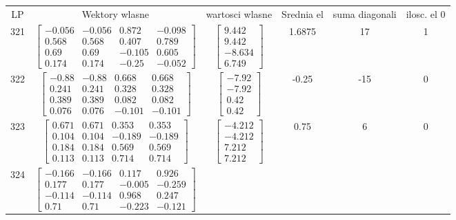 \documentclass[a4paper,12pt]{article}
\begin{document}
\bgroup {} \vspace{0.2in} \begin{tabular}{c c c c c c}
LP &Wektory wlasne & wartosci wlasne & Srednia el & suma diagonali & ilosc. el 0\\
321
&
$\begin{bmatrix} -0.056 & -0.056 & 0.872 & -0.098 \\ 0.568 & 0.568 & 0.407 & 0.789 \\ 0.69 & 0.69 & -0.105 & 0.605 \\ 0.174 & 0.174 & -0.25 & -0.052 \end{bmatrix}$
&
$\begin{bmatrix} 9.442 \\ 9.442 \\ -8.634 \\ 6.749 \end{bmatrix}$
&
1.6875
&
17
&
1
\\
322
&
$\begin{bmatrix} -0.88 & -0.88 & 0.668 & 0.668 \\ 0.241 & 0.241 & 0.328 & 0.328 \\ 0.389 & 0.389 & 0.082 & 0.082 \\ 0.076 & 0.076 & -0.101 & -0.101 \end{bmatrix}$
&
$\begin{bmatrix} -7.92 \\ -7.92 \\ 0.42 \\ 0.42 \end{bmatrix}$
&
-0.25
&
-15
&
0
\\
323
&
$\begin{bmatrix} 0.671 & 0.671 & 0.353 & 0.353 \\ 0.104 & 0.104 & -0.189 & -0.189 \\ 0.184 & 0.184 & 0.569 & 0.569 \\ 0.113 & 0.113 & 0.714 & 0.714 \end{bmatrix}$
&
$\begin{bmatrix} -4.212 \\ -4.212 \\ 7.212 \\ 7.212 \end{bmatrix}$
&
0.75
&
6
&
0
\\
324
&
$\begin{bmatrix} -0.166 & -0.166 & 0.117 & 0.926 \\ 0.177 & 0.177 & -0.005 & -0.259 \\ -0.114 & -0.114 & 0.968 & 0.247 \\ 0.71 & 0.71 & -0.223 & -0.121 \end{bmatrix}$

\end{tabular}
\end{document}
